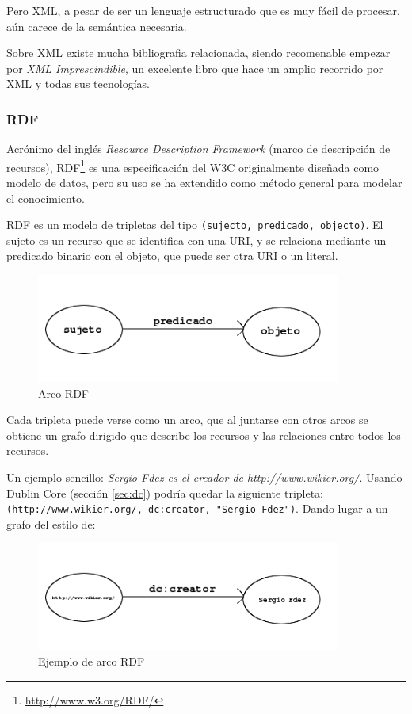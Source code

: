 Pero XML, a pesar de ser un lenguaje estructurado que es muy fácil de procesar, 
aún carece de la semántica necesaria. 

Sobre XML existe mucha bibliografia relacionada, siendo recomenable empezar por
\emph{XML Imprescindible}\cite{XMLNutshell}, un excelente libro que hace un amplio
recorrido por XML y todas sus tecnologías.

\subsubsection{RDF}

Acrónimo del inglés \emph{Resource Description Framework} (marco de descripción 
de recursos), RDF\footnote{\url{http://www.w3.org/RDF/}} es una especificación del 
W3C originalmente diseñada como modelo de datos, pero su uso se ha extendido como
método general para modelar el conocimiento.

RDF es un modelo de tripletas del tipo \texttt{(sujecto, predicado, objecto)}. El
sujeto es un recurso que se identifica con una URI, y se relaciona mediante un 
predicado binario con el objeto, que puede ser otra URI o un literal.

\begin{figure}[ht]
	\centering
	\includegraphics[width=10cm]{images/arc.png}
	\caption{Arco RDF}
	\label{fig:rdfTriplet}
\end{figure}

Cada tripleta puede verse como un arco, que al juntarse con otros arcos se obtiene
un grafo dirigido que describe los recursos y las relaciones entre todos los 
recursos.

Un ejemplo sencillo: \textit{Sergio Fdez es el creador de http://www.wikier.org/}. 
Usando Dublin Core (sección \ref{sec:dc}) podría quedar la siguiente tripleta: 
\texttt{(http://www.wikier.org/, dc:creator, "Sergio Fdez")}. Dando lugar a un 
grafo del estilo de:

\begin{figure}[ht]
	\centering
	\includegraphics[width=10cm]{images/arc-example.png}
	\caption{Ejemplo de arco RDF}
	\label{fig:rdfTripletExample}
\end{figure}


